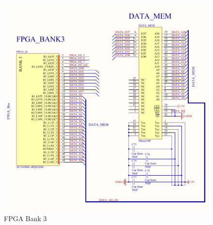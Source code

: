 \begin{figure}[h]
  \centering
  \includegraphics[width=\textwidth]{fig/pcb/schematics/pcbschematic_fpgab3.pdf}
  \caption{FPGA Bank 3}
  \label{fig:schematic-pcb-fpgab3}
\end{figure}
